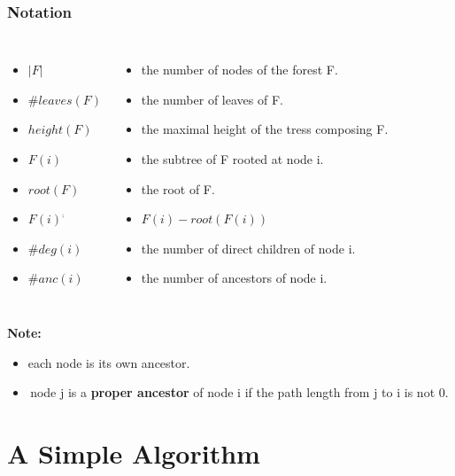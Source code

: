 \documentclass{beamer}
\begin{document}
\begin{frame}
\frametitle{Notation}
\begin{columns}[c]
\begin{itemize}
\item \emph{$\left\vert F \right\vert$} 
\item \emph{$\#leaves(F)$} 
\item \emph{$height(F)$} 
\item \emph{$F(i)$} 
\item \emph{$root(F)$}
\item \emph{$F(i)^{\comp}$}
\item \emph{$\#deg(i)$} 
\item \emph{$\#anc(i)$} 
\end{itemize}
\begin{itemize}[]
\item[]  the number of nodes of the forest F.
\item[]  the number of leaves of F.
\item[]  the maximal height of the tress composing F.
\item[]  the subtree of F rooted at node i.
\item[]  the root of F.
\item[] $F(i) - root(F(i))$
\item[]  the number of direct children of node i.
\item[]  the number of ancestors of node i. 
\end{itemize}
\end{columns}

\textbf{Note:} 
\begin{itemize}
\item each node is its own ancestor.
\item  node j is a \textbf{proper ancestor} of node i if the path length from j to i is not 0.
\end{itemize}
\end{frame}

\section{A Simple Algorithm}
\end{document}
